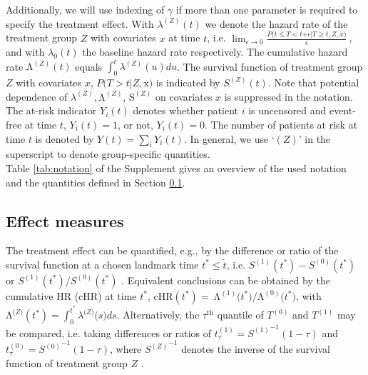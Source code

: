 \documentclass{article}
\begin{document}
\noindent Additionally, we will use indexing of $\gamma$ if more than one parameter is required to specify the treatment effect. With ${\lambda }^{\left(Z\right)}(t)$ we denote the hazard rate of the treatment group $Z$ with covariates $x$ at time $t$, i.e. ${\mathop{\mathrm{lim}}_{\epsilon \mathrm{\to }\mathrm{0}} \frac{P\mathrm{(}t\mathrm{\le }T\mathrm{<}t\mathrm{+}\epsilon \mathrm{|}T\mathrm{\ge }t,Z,x\mathrm{)}}{\epsilon }\ }$, and with ${\lambda }_0(t)$ the baseline hazard rate respectively. The cumulative hazard rate ${\mathrm{\Lambda }}^{\left(Z\right)}(t)$ equals $\int^t_0{{\lambda }^{\left(Z\right)}(u)du}$. The survival function of treatment group $Z$ with covariates $x$, $P\mathrm{(}T\mathrm{>}t\mathrm{|}Z\mathrm{,x)}$ is indicated by $S^{\left(Z\right)}\left(t\right).$ Note that potential dependence of ${\lambda }^{\left(Z\right)},{\mathrm{\Lambda }}^{\left(Z\right)}$, ${\mathrm{S}}^{\left(Z\right)}$ on covariates $x$ is suppressed in the notation. The at-risk indicator $Y_i(t)$ denotes whether patient $i$ is uncensored and event-free at time $t$, $Y_i(t)=1$, or not, $Y_i(t)=0$.
The number of patients at risk at time $t$ is denoted by $Y\left(t\right)=\sum_i{Y_i\left(t\right)}$. In general, we use `$(Z)$' in the superscript to denote group-specific quantities. \\
Table \ref{tab:notation} of the Supplement gives an overview of the used notation and the quantities defined in Section \ref{effect}.

\subsection{Effect measures} \label{effect}
\noindent The treatment effect can be quantified, e.g.\@, by the difference or ratio of the survival function at a chosen landmark time $t^*\mathrm{\le }\tilde{t}$, i.e. $S^{\left(1\right)}\left(t^*\right)-S^{\left(0\right)}(t^*)$ or ${S^{\left(1\right)}(t^*)}/{S^{\left(0\right)}(t^*)}$ \cite{Uno.2014}.
Equivalent conclusions can be obtained by the cumulative $\text{HR}$ ($\text{cHR}$) at time $t^{\mathrm{*}}$, $\text{cHR}\left(t^{\mathrm{*}}\right)\mathrm{=\ }{\mathrm{\Lambda }}^{\left(\mathrm{1}\right)}\mathrm{(}t^{\mathrm{*}}\mathrm{)/}{\mathrm{\Lambda }}^{\mathrm{(0)}}\mathrm{(}t^{\mathrm{*}}\mathrm{)}$, with ${\mathrm{\Lambda }}^{\mathrm{(}Z\mathrm{)}}\left(t^{\mathrm{*}}\right)\mathrm{=}\int^{t^{\mathrm{*}}}_0{{\lambda }^{\mathrm{(}Z\mathrm{)}}\mathrm{(}s\mathrm{)}ds}$.
Alternatively, the ${\tau }^{\mathrm{th}}$ quantile of $T^{\left(0\right)}$ and $T^{\left(1\right)}$ may be compared, i.e. taking differences or ratios of $t^{\left(1\right)}_{\tau }={S^{\left(\mathrm{1}\right)}}^{-1}\left(1-\tau \right)$ and $t^{\left(0\right)}_{\tau }={S^{\left(0\right)}}^{-1}\left(1-\tau \right)$, where ${S^{\left(Z\right)}}^{-1}$ denotes the inverse of the survival function of treatment group $Z$ \cite{Uno.2014}.
\end{document}
